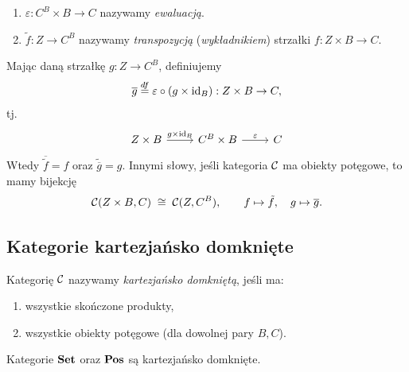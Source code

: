 \begin{uwaga}[Notacja]
\begin{enumerate}
\item $\varepsilon : C^B \times B \to C$ nazywamy \emph{ewaluacją}.
\item $\tilde{f} : Z \to C^B$ nazywamy \emph{transpozycją} (\emph{wykładnikiem}) strzałki $f : Z \times B \to C$.
\end{enumerate}
\end{uwaga}

\begin{uwaga}
Mając daną strzałkę $g : Z \to C^B$, definiujemy
\[
\overline{g} \stackrel{df}{=} \varepsilon \circ (g \times \mathrm{id}_B) : Z \times B \to C,
\]
tj.
\[
\begin{tikzcd}
Z \times B \arrow[r, "g \times \id_B"] & C^B \times B \arrow[r, "\varepsilon"] & C
\end{tikzcd}
\]
Wtedy $\overline{\tilde{f}} = f$ oraz $\widetilde{\overline{g}}=g$. Innymi słowy, jeśli kategoria $\mathcal{C}$ ma obiekty potęgowe, to mamy bijekcję
\[
\mathcal{C}(Z \times B, C) \;\cong\; \mathcal{C}(Z, C^B), \qquad f \mapsto \tilde{f}, \quad g \mapsto \overline{g}.
\]
\end{uwaga}

\subsection*{Kategorie kartezjańsko domknięte}

\begin{definicja}
Kategorię $\mathcal{C}$ nazywamy \emph{kartezjańsko domkniętą}, jeśli ma:
\begin{enumerate}
\item wszystkie skończone produkty,
\item wszystkie obiekty potęgowe (dla dowolnej pary $B, C$).
\end{enumerate}
\end{definicja}

\begin{stwierdzenie}
Kategorie $\mathbf{Set}$ oraz $\mathbf{Pos}$ są kartezjańsko domknięte.
\end{stwierdzenie}

